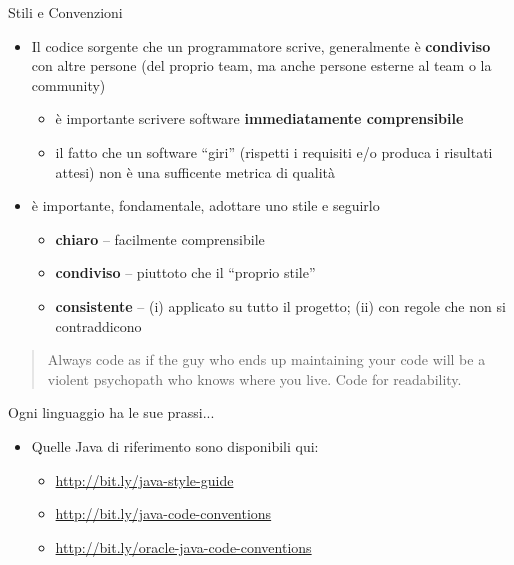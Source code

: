 \documentclass[xcolor=dvipsnames,presentation]{beamer}
\begin{document}
\begin{frame}[allowframebreaks]{Stili e Convenzioni}
    \begin{itemize}\itemsep10pt
        \item Il codice sorgente che un programmatore scrive, generalmente è \textbf{condiviso} con altre persone (del proprio team, ma anche persone esterne al team o la community)
        \begin{itemize}
            \item è importante scrivere software \textbf{immediatamente comprensibile}
            \item il fatto che un software ``giri'' (rispetti i requisiti e/o produca i risultati attesi) non è una sufficente metrica di qualità
        \end{itemize}
        \item è importante, fondamentale, adottare uno stile e seguirlo
        \begin{itemize}
            \item \textbf{chiaro} -- facilmente comprensibile
            \item \textbf{condiviso} -- piuttoto che il ``proprio stile''
            \item \textbf{consistente} -- (i) applicato su tutto il progetto; (ii) con regole che non si contraddicono
        \end{itemize}
    \end{itemize}

\begin{block}{}
\begin{quote}
Always code as if the guy who ends up maintaining your code will be a violent psychopath who knows where you live. Code for readability.
\end{quote}
\end{block}

\begin{block}{Ogni linguaggio ha le sue prassi...}
\begin{itemize}
        \item Quelle Java di riferimento sono disponibili qui:
        \tiny
        \begin{itemize}
            \item \url{http://bit.ly/java-style-guide}
            \item \url{http://bit.ly/java-code-conventions}
            \item \url{http://bit.ly/oracle-java-code-conventions}
        \end{itemize}
    \end{itemize}
\end{block}


\end{frame}
\end{document}
